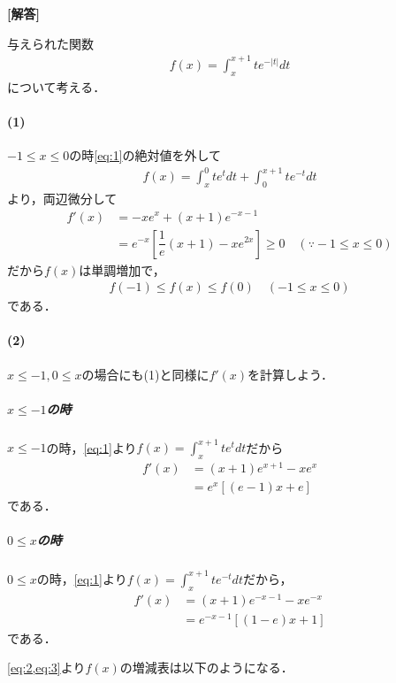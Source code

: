 \documentclass[../../main.tex]{subfiles}
\begin{document}
\begin{oframed}
  
\end{oframed}

{\bf [解答]}

与えられた関数
\begin{align}
  f(x)=\int_x^{x+1}te^{-|t|}dt \label{eq:1}
\end{align}
について考える．

\paragraph{(1)}

$-1\le x\le0$の時\cref{eq:1}の絶対値を外して
\begin{align}
  f(x)=\int_x^0te^tdt+\int_0^{x+1}te^{-t}dt
\end{align}
より，両辺微分して
\begin{align}
  f'(x)
  &=-xe^x+(x+1)e^{-x-1}\\
  &=e^{-x}\left[\dfrac{1}{e}(x+1)-xe^{2x}\right]\ge0\quad(\because-1\le x\le0)
\end{align}
だから$f(x)$は単調増加で，
\begin{align}
  f(-1)\le f(x)\le f(0)\quad(-1\le x\le0)
\end{align}
である．

\paragraph{(2)}

$x \le -1, 0 \le x$の場合にも(1)と同様に$f'(x)$を計算しよう．

\subparagraph{$x\le-1$の時}

$x\le-1$の時，\cref{eq:1}より$f(x)=\displaystyle\int_x^{x+1}te^tdt$だから
\begin{align}
  f'(x)&=(x+1)e^{x+1}-xe^x\\
  &=e^x\left[(e-1)x+e\right] \label{eq:2}
\end{align}
である．

\subparagraph{$0\le x$の時}

$0\le x$の時，\cref{eq:1}より$f(x)=\displaystyle\int_x^{x+1}te^{-t}dt$だから，
\begin{align}
  f'(x)&=(x+1)e^{-x-1}-xe^{-x}\\
  &=e^{-x-1}\left[(1-e)x+1\right] \label{eq:3}
\end{align}
である．
\casesend

\cref{eq:2,eq:3}より$f(x)$の増減表は以下のようになる．
\end{document}
